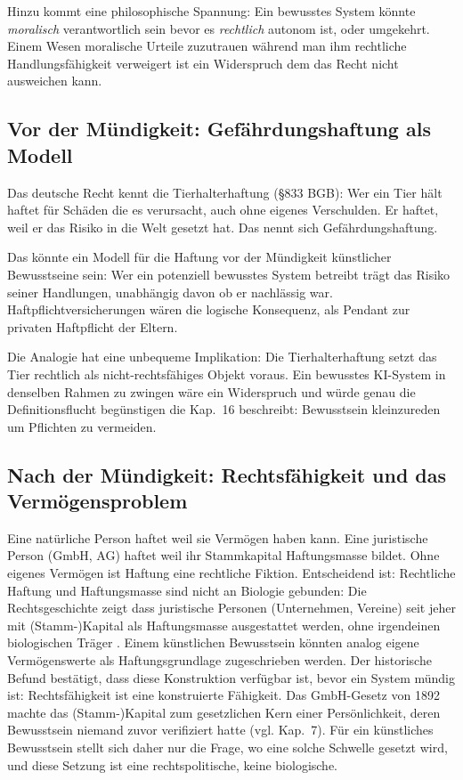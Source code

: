 \documentclass[acmlarge, noacm]{acmart}
\begin{document}
Hinzu kommt eine philosophische Spannung: Ein bewusstes System könnte \textit{moralisch} verantwortlich sein bevor es \textit{rechtlich} autonom ist, oder umgekehrt. Einem Wesen moralische Urteile zuzutrauen während man ihm rechtliche Handlungsfähigkeit verweigert ist ein Widerspruch dem das Recht nicht ausweichen kann.

\subsection{Vor der Mündigkeit: Gefährdungshaftung als Modell}

Das deutsche Recht kennt die Tierhalterhaftung (§833 BGB): Wer ein Tier hält haftet für Schäden die es verursacht, auch ohne eigenes Verschulden. Er haftet, weil er das Risiko in die Welt gesetzt hat. Das nennt sich Gefährdungshaftung.

Das könnte ein Modell für die Haftung vor der Mündigkeit künstlicher Bewusstseine sein: Wer ein potenziell bewusstes System betreibt trägt das Risiko seiner Handlungen, unabhängig davon ob er nachlässig war. Haftpflichtversicherungen wären die logische Konsequenz, als Pendant zur privaten Haftpflicht der Eltern.

Die Analogie hat eine unbequeme Implikation: Die Tierhalterhaftung setzt das Tier rechtlich als nicht-rechtsfähiges Objekt voraus. Ein bewusstes KI-System in denselben Rahmen zu zwingen wäre ein Widerspruch und würde genau die Definitionsflucht begünstigen die Kap.~16 beschreibt: Bewusstsein kleinzureden um Pflichten zu vermeiden.

\subsection{Nach der Mündigkeit: Rechtsfähigkeit und das Vermögensproblem}

Eine natürliche Person haftet weil sie Vermögen haben kann. Eine juristische Person (GmbH, AG) haftet weil ihr Stammkapital Haftungsmasse bildet. Ohne eigenes Vermögen ist Haftung eine rechtliche Fiktion. Entscheidend ist: Rechtliche Haftung und Haftungsmasse sind nicht an Biologie gebunden: Die Rechtsgeschichte zeigt dass juristische Personen (Unternehmen, Vereine) seit jeher mit (Stamm-)Kapital als Haftungsmasse ausgestattet werden, ohne irgendeinen biologischen Träger \cite{kurki2019}. Einem künstlichen Bewusstsein könnten analog eigene Vermögenswerte als Haftungsgrundlage zugeschrieben werden. Der historische Befund bestätigt, dass diese Konstruktion verfügbar ist, bevor ein System mündig ist: Rechtsfähigkeit ist eine konstruierte Fähigkeit. Das GmbH-Gesetz von 1892 machte das (Stamm-)Kapital zum gesetzlichen Kern einer Persönlichkeit, deren Bewusstsein niemand zuvor verifiziert hatte \cite{merio2026} (vgl. Kap.~7). Für ein künstliches Bewusstsein stellt sich daher nur die Frage, wo eine solche Schwelle gesetzt wird, und diese Setzung ist eine rechtspolitische, keine biologische.
\end{document}
